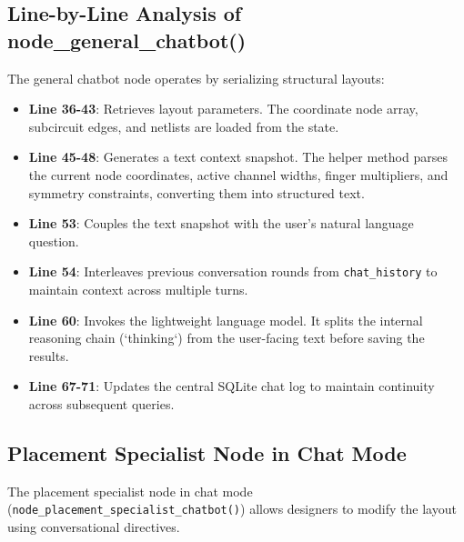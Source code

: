 \subsection{Line-by-Line Analysis of node\_general\_chatbot()}
The general chatbot node operates by serializing structural layouts:
\begin{itemize}
    \item \textbf{Line 36-43}: Retrieves layout parameters. The coordinate node array, subcircuit edges, and netlists are loaded from the state.
    \item \textbf{Line 45-48}: Generates a text context snapshot. The helper method parses the current node coordinates, active channel widths, finger multipliers, and symmetry constraints, converting them into structured text.
    \item \textbf{Line 53}: Couples the text snapshot with the user's natural language question.
    \item \textbf{Line 54}: Interleaves previous conversation rounds from \texttt{chat\_history} to maintain context across multiple turns.
    \item \textbf{Line 60}: Invokes the lightweight language model. It splits the internal reasoning chain (`thinking`) from the user-facing text before saving the results.
    \item \textbf{Line 67-71}: Updates the central SQLite chat log to maintain continuity across subsequent queries.
\end{itemize}

\subsection{Placement Specialist Node in Chat Mode}
The placement specialist node in chat mode (\texttt{node\_}\allowbreak\texttt{placement\_}\allowbreak\texttt{specialist\_}\allowbreak\texttt{chatbot()}) allows designers to modify the layout using conversational directives. 

